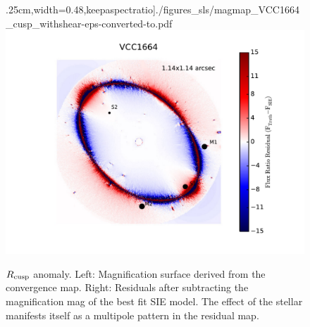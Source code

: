 \begin{itemize}
\begin{figure}
		.25cm,width=0.48\linewidth,keepaspectratio]{./figures_sls/magmap_VCC1664_cusp_withshear-eps-converted-to.pdf}
		\includegraphics[clip,trim=2.5cm .5cm 1cm
		.25cm,width=0.48\linewidth,keepaspectratio]{./figures_sls/res_map_VCC1664_cusp_withshear-eps-converted-to.pdf}
		\caption{\label{fig:magmaps_VCC1664} $R_{\rm{cusp}}$ anomaly. Left: Magnification surface derived from the convergence map. Right: Residuals after subtracting the magnification mag of the best fit SIE model. The effect of the stellar manifests itself as a multipole pattern in the residual map.}
	\end{figure}

\end{itemize}
